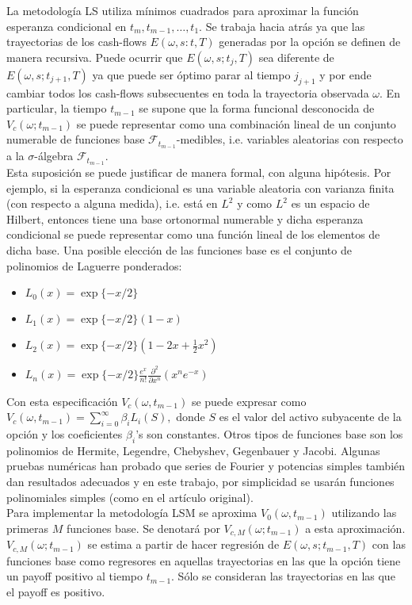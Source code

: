 \documentclass[11pt]{article}
\begin{document}
La metodología LS utiliza mínimos cuadrados para aproximar la función esperanza condicional en $t_m, t_{m-1},\ldots,t_1$. Se trabaja hacia atrás ya que las trayectorias de los cash-flows $E(\omega,s:t,T)$ generadas por la opción se  definen de manera recursiva. Puede ocurrir que $E(\omega,s;t_j,T)$ sea diferente  de $E(\omega,s;t_{j+1},T)$ ya que puede ser óptimo parar al tiempo $j_{j+1}$ y por ende cambiar todos los cash-flows subsecuentes en toda la trayectoria  observada $\omega$. En particular, la tiempo $t_{m-1}$ se supone que la forma funcional desconocida de $V_c(\omega;t_{m-1})$ se puede representar como una combinación lineal de un conjunto numerable de funciones base $\mathcal{F}_{t_{m-1}}$-medibles, i.e. variables aleatorias con respecto a la $\sigma$-álgebra $\mathcal{F}_{t_{m-1}}$.\\
	
Esta suposición se puede justificar de manera formal, con alguna hipótesis. Por ejemplo, si la esperanza condicional es una variable aleatoria con varianza 
finita (con respecto a alguna medida), i.e. está en $L^2$ y como $L^2$ es un espacio de Hilbert, entonces tiene una base ortonormal numerable y dicha esperanza condicional se puede representar como una función lineal de los elementos de dicha base. Una posible elección de las funciones base es el conjunto de polinomios de Laguerre ponderados:

\begin{itemize}
\item $L_0(x) = \exp\{-x/2\}$  
\item $L_1(x)=\exp\{-x/2\}(1-x)$  
\item $L_2(x)=\exp\{-x/2\}(1-2x+\frac{1}{2}x^2)$  
\item $L_n(x)=\exp\{-x/2\}\frac{e^x}{n!}\frac{\partial^2}{\partial x^n}(x^ne^{-x})$
\end{itemize}
	
Con esta especificación $V_c(\omega,t_{m-1})$ se puede expresar como $V_c(\omega,t_{m-1})=\sum_{i=0}^{\infty}\beta_iL_i(S),$ donde $S$ es el valor del activo subyacente de la opción y los coeficientes $\beta_i$'s son constantes. Otros tipos de funciones base son los polinomios de Hermite, Legendre, Chebyshev, Gegenbauer y Jacobi. Algunas pruebas numéricas han probado que series de Fourier y potencias simples también dan resultados adecuados y en este trabajo, por simplicidad se usarán funciones polinomiales simples (como en el artículo original).\\

Para implementar la metodología LSM se aproxima $V_0(\omega,t_{m-1})$ utilizando las primeras $M$ funciones base. Se denotará por $V_{c,M}(\omega;t_{m-1})$ a esta aproximación.
$V_{c,M}(\omega;t_{m-1})$ se estima a partir de hacer regresión de $E(\omega,s;t_{m-1},T)$ con las funciones base como regresores en aquellas trayectorias en las que la opción tiene un payoff positivo al tiempo $t_{m-1}$. Sólo se consideran las trayectorias en las que el payoff es positivo.\\
\end{document}
